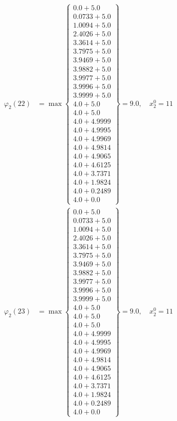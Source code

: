 \documentclass{article}
\begin{document}
\begin{align*}
\varphi_{2}(22) &= \max \left\{ \begin{array}{c}
0.0 + 5.0 \\
 0.0733 + 5.0 \\
 1.0094 + 5.0 \\
 2.4026 + 5.0 \\
 3.3614 + 5.0 \\
 3.7975 + 5.0 \\
 3.9469 + 5.0 \\
 3.9882 + 5.0 \\
 3.9977 + 5.0 \\
 3.9996 + 5.0 \\
 3.9999 + 5.0 \\
 4.0 + 5.0 \\
 4.0 + 5.0 \\
 4.0 + 4.9999 \\
 4.0 + 4.9995 \\
 4.0 + 4.9969 \\
 4.0 + 4.9814 \\
 4.0 + 4.9065 \\
 4.0 + 4.6125 \\
 4.0 + 3.7371 \\
 4.0 + 1.9824 \\
 4.0 + 0.2489 \\
 4.0 + 0.0
\end{array} \right\}=9.0, \quad x_{2}^0=11\\
  
\varphi_{2}(23) &= \max \left\{ \begin{array}{c}
0.0 + 5.0 \\
 0.0733 + 5.0 \\
 1.0094 + 5.0 \\
 2.4026 + 5.0 \\
 3.3614 + 5.0 \\
 3.7975 + 5.0 \\
 3.9469 + 5.0 \\
 3.9882 + 5.0 \\
 3.9977 + 5.0 \\
 3.9996 + 5.0 \\
 3.9999 + 5.0 \\
 4.0 + 5.0 \\
 4.0 + 5.0 \\
 4.0 + 5.0 \\
 4.0 + 4.9999 \\
 4.0 + 4.9995 \\
 4.0 + 4.9969 \\
 4.0 + 4.9814 \\
 4.0 + 4.9065 \\
 4.0 + 4.6125 \\
 4.0 + 3.7371 \\
 4.0 + 1.9824 \\
 4.0 + 0.2489 \\
 4.0 + 0.0
\end{array} \right\}=9.0, \quad x_{2}^0=11\\
  

\end{align*}
\end{document}
